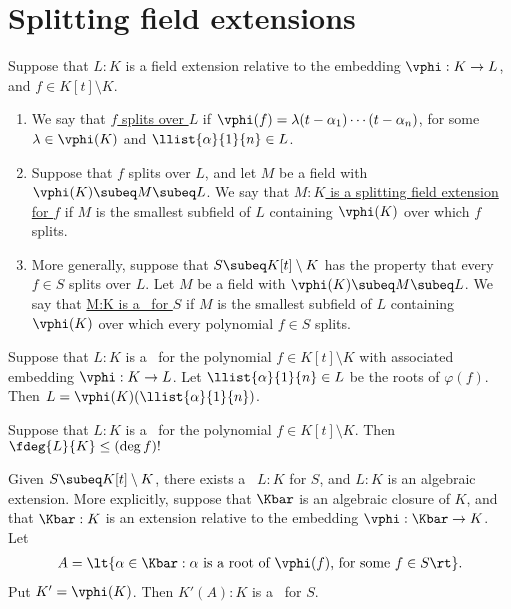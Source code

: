\documentclass[a4paper]{article}
\begin{document}
\section{Splitting field extensions}
\begin{tdefinition}
  Suppose that \( L:K \) is a field extension relative to the embedding \( \vphi : K\to L \), and \( f\in K[t]\setminus K \). \begin{enumerate}[label=(\roman*)]
    \item We say that \ul{\( f \) splits over \( L \)} if \( \vphi(f)=\lambda(t-\alpha_1)\cdots(t-\alpha_n) \), for some \( \lambda\in \vphi(K) \) and \( \llist{\alpha}{1}{n}\in L \).
    \item Suppose that \( f \) splits over \( L \), and let \( M \) be a field with \( \vphi(K)\subeq M\subeq L \).
      We say that \ul{\( M:K \) is a splitting field extension for \( f \)} if \( M \) is the smallest subfield of \( L \) containing \( \vphi(K) \) over which \( f \) splits.
    \item More generally, suppose that \( S\subeq K[t]\setminus K \) has the property that every \( f\in S \) splits over \( L \).
      Let \( M \) be a field with \( \vphi(K)\subeq M\subeq L \).
      We say that \ul{M:K is a \sfe~for \( S \)} if \( M \) is the smallest subfield of \( L \) containing \( \vphi(K) \) over which every polynomial \( f\in S \) splits.
  \end{enumerate}
\end{tdefinition}

\begin{tproposition}
  Suppose that \( L:K \) is a \sfe~for the polynomial \( f\in K[t]\setminus K \) with associated embedding \( \vphi:K\to L \).
  Let \( \llist{\alpha}{1}{n}\in L \) be the roots of \( \varphi(f) \).
  Then \( L=\vphi(K)(\llist{\alpha}{1}{n}) \).
\end{tproposition}

\begin{tproposition}
  Suppose that \( L:K \) is a \sfe~for the polynomial \( f\in K[t]\setminus K \).
  Then \( \fdeg{L}{K}\leq (\deg f)! \)
\end{tproposition}

\begin{tproposition}
  Given \( S\subeq K[t]\setminus K \), there exists a \sfe~\( L:K \) for \( S \), and \( L:K \) is an algebraic extension.
  More explicitly, suppose that \( \Kbar \) is an algebraic closure of \( K \), and that \( \Kbar:K \) is an extension relative to the embedding \( \vphi:\Kbar\to K \). Let
  \begin{align*}
    A=\lt\{ \alpha\in \Kbar : \alpha\text{ is a root of \( \vphi(f) \), for some } f\in S \rt\}.
  \end{align*}
  Put \( K'=\vphi(K) \).
  Then \( K'(A):K \) is a \sfe~for \( S \).
\end{tproposition}
\end{document}
